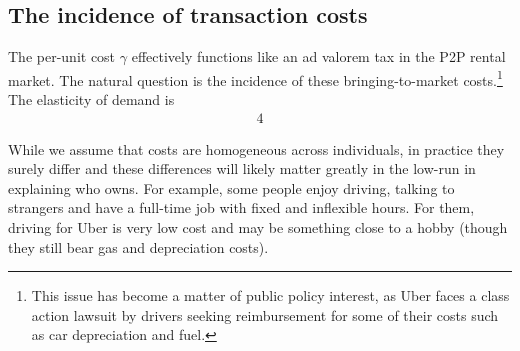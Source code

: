 \documentclass[11pt]{article}
\begin{document}
\subsection{The incidence of transaction costs}
The per-unit cost $\gamma$ effectively functions like an ad valorem tax in the P2P rental market.
The natural question is the incidence of these bringing-to-market costs.\footnote{
 This issue has become a matter of public policy interest, as Uber faces a class action lawsuit by drivers seeking reimbursement for some of their costs such as car depreciation and fuel. 
}
The elasticity of demand is
\begin{align}
4 
\end{align}


While we assume that costs are homogeneous across individuals, in practice they surely differ and these differences will likely matter greatly in the low-run in explaining who owns. 
For example, some people enjoy driving, talking to strangers and have a full-time job with fixed and inflexible hours.
For them, driving for Uber is very low cost and may be something close to a hobby (though they still bear gas and depreciation costs).



\end{document}

